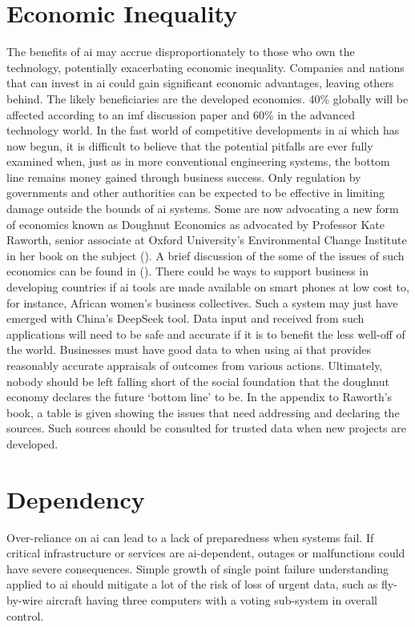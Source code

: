 \section{Economic Inequality}
The benefits of \gls{ai} may accrue disproportionately to those who own the technology, potentially exacerbating economic inequality. Companies and nations that can invest in \gls{ai} could gain significant economic advantages, leaving others behind. The likely beneficiaries are the developed economies. 40\% globally will be affected according to an \gls{imf} discussion paper and 60\% in the advanced technology world. In the fast world of competitive developments in \gls{ai} which has now begun,  it is difficult to believe that the potential pitfalls are ever fully examined when, just as in more conventional engineering systems, the bottom line remains money gained through business success. Only regulation by governments and other authorities can be expected to be effective in limiting damage outside the bounds of \gls{ai} systems. Some are now advocating a new form of economics known as Doughnut Economics as advocated by Professor Kate Raworth, senior associate at Oxford University’s Environmental Change Institute in her book on the subject (\cite{citationRaworth2017}). A brief discussion of the some of the issues of such economics can be found in (\cite{citation:SCSC193}). There could be ways to support business in developing countries if \gls{ai} tools are made available on smart phones at low cost to, for instance, African women’s business collectives. Such a system may just have emerged with China's DeepSeek tool. Data input and received from such applications will need to be safe and accurate if it is to benefit the less well-off of the world. Businesses must have good data to when using \gls{ai} that provides reasonably accurate appraisals of outcomes from various actions. Ultimately, nobody should be left falling short of the social foundation that the doughnut economy declares the future ‘bottom line’ to be. In the appendix to Raworth’s book, a table is given showing the issues that need addressing and declaring the sources. Such sources should be consulted for trusted data when new projects are developed. 

\section{Dependency}
Over-reliance on \gls{ai} can lead to a lack of preparedness when systems fail. If critical infrastructure or services are \gls{ai}-dependent, outages or malfunctions could have severe consequences. Simple growth of single point failure understanding applied to \gls{ai} should mitigate a lot of the risk of loss of urgent data, such as fly-by-wire aircraft having three computers with a voting sub-system in overall control.

